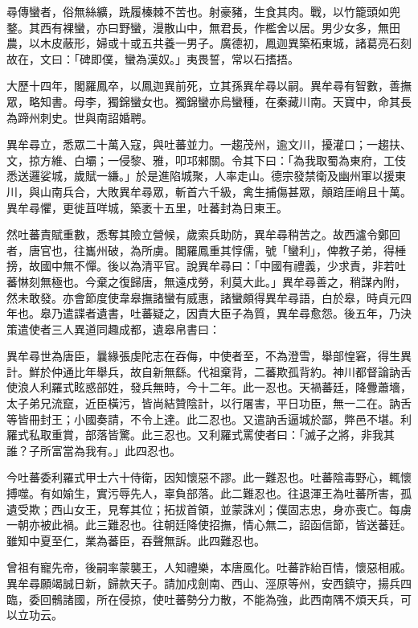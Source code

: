 \begin{pinyinscope}
 尋傳蠻者，俗無絲纊，跣履榛棘不苦也。射豪豬，生食其肉。戰，以竹籠頭如兜鍪。其西有裸蠻，亦曰野蠻，漫散山中，無君長，作檻舍以居。男少女多，無田農，以木皮蔽形，婦或十或五共養一男子。廣德初，鳳迦異築柘東城，諸葛亮石刻故在，文曰：「碑即僕，蠻為漢奴。」夷畏誓，常以石搘捂。



 大歷十四年，閣羅鳳卒，以鳳迦異前死，立其孫異牟尋以嗣。異牟尋有智數，善撫眾，略知書。母李，獨錦蠻女也。獨錦蠻亦烏蠻種，在秦藏川南。天寶中，命其長為蹄州刺史。世與南詔婚聘。



 異牟尋立，悉眾二十萬入寇，與吐蕃並力。一趨茂州，逾文川，擾灌口；一趨扶、文，掠方維、白壩；一侵黎、雅，叩邛郲關。令其下曰：「為我取蜀為東府，工伎悉送邏娑城，歲賦一縑。」於是進陷城聚，人率走山。德宗發禁衛及幽州軍以援東川，與山南兵合，大敗異牟尋眾，斬首六千級，禽生捕傷甚眾，顛踣厓峭且十萬。異牟尋懼，更徙苴咩城，築袤十五里，吐蕃封為日東王。



 然吐蕃責賦重數，悉奪其險立營候，歲索兵助防，異牟尋稍苦之。故西瀘令鄭回者，唐官也，往巂州破，為所虜。閣羅鳳重其惇儒，號「蠻利」，俾教子弟，得棰搒，故國中無不憚。後以為清平官。說異牟尋曰：「中國有禮義，少求責，非若吐蕃惏刻無極也。今棄之復歸唐，無遠戍勞，利莫大此。」異牟尋善之，稍謀內附，然未敢發。亦會節度使韋皋撫諸蠻有威惠，諸蠻頗得異牟尋語，白於皋，時貞元四年也。皋乃遣諜者遺書，吐蕃疑之，因責大臣子為質，異牟尋愈怨。後五年，乃決策遣使者三人異道同趣成都，遺皋帛書曰：



 異牟尋世為唐臣，曩緣張虔陀志在吞侮，中使者至，不為澄雪，舉部惶窘，得生異計。鮮於仲通比年舉兵，故自新無繇。代祖棄背，二蕃欺孤背約。神川都督論訥舌使浪人利羅式眩惑部姓，發兵無時，今十二年。此一忍也。天禍蕃廷，降釁蕭墻，太子弟兄流竄，近臣橫污，皆尚結贊陰計，以行屠害，平日功臣，無一二在。訥舌等皆冊封王；小國奏請，不令上達。此二忍也。又遣訥舌逼城於鄙，弊邑不堪。利羅式私取重賞，部落皆驚。此三忍也。又利羅式罵使者曰：「滅子之將，非我其誰？子所富當為我有。」此四忍也。



 今吐蕃委利羅式甲士六十侍衛，因知懷惡不謬。此一難忍也。吐蕃陰毒野心，輒懷搏噬。有如媮生，實污辱先人，辜負部落。此二難忍也。往退渾王為吐蕃所害，孤遺受欺；西山女王，見奪其位；拓拔首領，並蒙誅刈；僕固志忠，身亦喪亡。每虜一朝亦被此禍。此三難忍也。往朝廷降使招撫，情心無二，詔函信節，皆送蕃廷。雖知中夏至仁，業為蕃臣，吞聲無訴。此四難忍也。



 曾祖有寵先帝，後嗣率蒙襲王，人知禮樂，本唐風化。吐蕃詐紿百情，懷惡相戚。異牟尋願竭誠日新，歸款天子。請加戍劍南、西山、涇原等州，安西鎮守，揚兵四臨，委回鶻諸國，所在侵掠，使吐蕃勢分力散，不能為強，此西南隅不煩天兵，可以立功云。




\end{pinyinscope}
